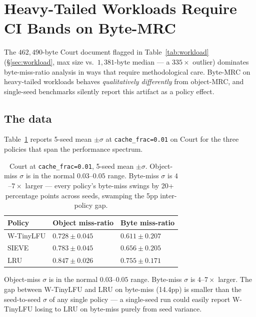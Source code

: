 \section{Heavy-Tailed Workloads Require CI Bands on Byte-MRC}\label{sec:byte-mrc}

The $462{,}490$-byte Court document flagged in Table~\ref{tab:workload}
(\S\ref{sec:workload}, max size vs.\ $1{,}381$-byte median --- a $335\times$
outlier) dominates byte-miss-ratio analysis in ways that require
methodological care. Byte-MRC on heavy-tailed workloads behaves
\emph{qualitatively differently} from object-MRC, and single-seed benchmarks
silently report this artifact as a policy effect.

\subsection{The data}

Table~\ref{tab:byte_mrc_variance} reports 5-seed mean $\pm \sigma$ at
\texttt{cache\_frac=0.01} on Court for the three policies that span the
performance spectrum.

\begin{table}[h]
\centering
\footnotesize
\renewcommand{\arraystretch}{0.92}
\begin{tabularx}{\textwidth}{@{}lXX@{}}
\toprule
\textbf{Policy} & \textbf{Object miss-ratio} & \textbf{Byte miss-ratio} \\
\midrule
W-TinyLFU & $0.728 \pm 0.045$ & $\mathbf{0.611 \pm 0.207}$ \\
SIEVE     & $0.783 \pm 0.045$ & $0.656 \pm 0.205$ \\
LRU       & $0.847 \pm 0.026$ & $0.755 \pm 0.171$ \\
\bottomrule
\end{tabularx}
\caption{Court at \texttt{cache\_frac=0.01}, 5-seed mean $\pm \sigma$.
Object-miss $\sigma$ is in the normal $0.03$--$0.05$ range. Byte-miss
$\sigma$ is $4$--$7\times$ larger --- every policy's byte-miss swings by
20+ percentage points across seeds, swamping the 5pp inter-policy gap.}
\label{tab:byte_mrc_variance}
\end{table}

Object-miss $\sigma$ is in the normal $0.03$--$0.05$ range. Byte-miss $\sigma$
is $4$--$7\times$ larger. The gap between W-TinyLFU and LRU on byte-miss
(14.4pp) is smaller than the seed-to-seed $\sigma$ of any single policy --- a
single-seed run could easily report W-TinyLFU losing to LRU on byte-miss
purely from seed variance.

